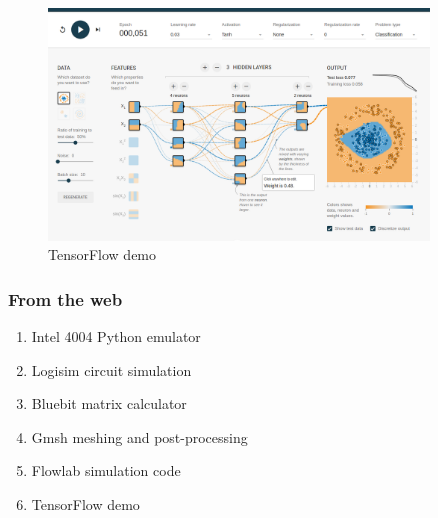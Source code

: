 \documentclass[xcolor=dvipsnames]{beamer}
\begin{document}
\begin{frame}{}
\begin{figure}
  \centering
  \caption {TensorFlow demo}
  \includegraphics[width=0.9\textwidth]{tensorflow_demo}
\end{figure}
\end{frame}


\begin{frame}
  \frametitle{From the web}
  \begin{enumerate}
  \item Intel 4004 Python emulator
  \item Logisim circuit simulation
  \item Bluebit matrix calculator
  \item Gmsh meshing and post-processing
  \item Flowlab simulation code
  \item TensorFlow demo
\end{enumerate}
\end{frame}
\end{document}
